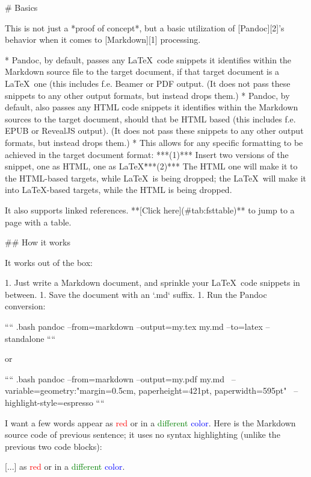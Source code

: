 
# Basics

This is not just a *proof of concept*, but a basic utilization of [Pandoc][2]'s behavior
when it comes to [Markdown][1] processing.

* Pandoc, by default, passes any \LaTeX\ code snippets it identifies within the Markdown
  source file to the target document, if that target document is a \LaTeX\ one (this
  includes f.e. Beamer or PDF output.
  (It does not pass these snippets to any other output formats, but instead drops them.)
* Pandoc, by default, also passes any HTML code snippets it identifies within the
  Markdown sources to the target document, should that be HTML based (this includes f.e.
  EPUB or RevealJS output).
  (It does not pass these snippets to any other output formats, but instead drops them.)
* This allows for any specific formatting to be achieved in the target document format:
  ***(1)*** Insert two versions of the snippet, one as HTML, one as \LaTeX\. ***(2)***
  The HTML one will make it to the HTML-based targets, while \LaTeX\ is being dropped;
  the \LaTeX\ will make it into \LaTeX-based targets, while the HTML is being dropped.

It also supports linked references. **[Click here](#tab:fsttable)** to jump to a page with a
table.


## How it works

It works out of the box:

1. Just write a Markdown document, and sprinkle your \LaTeX\ code snippets in between.
1. Save the document with an `.md` suffix.
1. Run the Pandoc conversion:

    ```` {.bash}
     pandoc --from=markdown --output=my.tex my.md --to=latex --standalone
    ````

    or

    ```` {.bash}
     pandoc --from=markdown --output=my.pdf my.md                                   \
            --variable=geometry:"margin=0.5cm, paperheight=421pt, paperwidth=595pt" \
            --highlight-style=espresso
    ````

I want a few words appear as \textcolor{red}{red} or in a \textcolor{green}{different}
\textcolor{blue}{color}. Here is the Markdown source code of previous sentence; it uses
no syntax highlighting (unlike the previous two code blocks):

     [...] as \textcolor{red}{red} or in a \textcolor{green}{different}
     \textcolor{blue}{color}.

